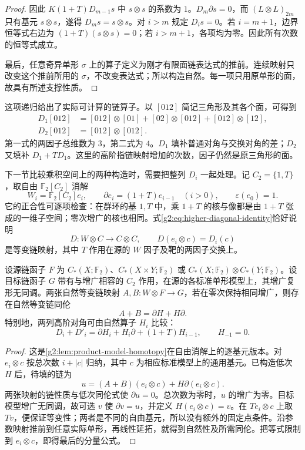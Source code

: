 \begin{proof}
	因此 \(K(1+T)D_{m-1}s\) 中 \(s\otimes s\) 的系数为 \(1\)。\(D_m\partial s=0\)，而 \((L\otimes L)_{2m}\) 只有基元 \(s\otimes s\)，遂得 \(D_ms=s\otimes s\)。对 \(i>m\) 规定 \(D_is=0\)。若 \(i=m+1\)，边界恒等式右边为 \((1+T)(s\otimes s)=0\)；若 \(i>m+1\)，各项均为零。因此所有次数的恒等式成立。

	最后，任意奇异单形 \(\sigma\) 上的算子定义为刚才有限面链表达式的推前。连续映射只改变这个推前所用的 \(\sigma\)，不改变表达式；所以构造自然。每一项只用原单形的面，故具有所述支撑性质。
\end{proof}

这项递归给出了实际可计算的链算子。以 \([012]\) 简记三角形及其各个面，可得到
\[
	\begin{aligned}
		D_1[012]&=[012]\otimes[01]+[02]\otimes[012]+[012]\otimes[12],\\
		D_2[012]&=[012]\otimes[012].
	\end{aligned}
\]
第一式的两因子总维数为 \(3\)，第二式为 \(4\)。\(D_1\) 填补普通对角与交换对角的差；\(D_2\) 又填补 \(D_1+TD_1\)。这里的高阶指链映射增加的次数，因子仍然是原三角形的面。

\ProseParagraphBreak

下一节比较乘积空间上的两种构造时，需要把整列 \(D_i\) 一起处理。记 \(C_2=\{1,T\}\)，取自由 \(\mathbb F_2[C_2]\) 消解
\[
	W_i=\mathbb F_2[C_2]e_i,\qquad
	\partial e_i=(1+T)e_{i-1}\quad(i>0),\qquad \varepsilon(e_0)=1.
\]
它的正合性可逐项检查：在群环的基 \(1,T\) 中，乘 \(1+T\) 的核与像都是由 \(1+T\) 张成的一维子空间；零次增广的核也相同。式\eqref{g2:eq:higher-diagonal-identity}恰好说明
\[
	D:W\otimes C\longrightarrow C\otimes C,\qquad D(e_i\otimes c)=D_i(c)
\]
是等变链映射，其中 \(T\) 作用在源的 \(W\) 因子及靶的两因子交换上。

\begin{lemma}\label{g2:lem:higher-diagonal-comparison}
	设源链函子 \(F\) 为 \(C_*(X;\mathbb F_2)\)、\(C_*(X\times Y;\mathbb F_2)\) 或 \(C_*(X;\mathbb F_2)\otimes C_*(Y;\mathbb F_2)\)。设目标链函子 \(G\) 带有与增广相容的 \(C_2\) 作用，在源的各标准单形模型上，其增广复形无同调。两张自然等变链映射 \(A,B:W\otimes F\to G\)，若在零次保持相同增广，则存在自然等变链同伦
	\[
		A+B=\partial H+H\partial.
	\]
	特别地，两列高阶对角可由自然算子 \(H_i\) 比较：
	\begin{equation}\label{g2:eq:higher-diagonal-comparison}
		D_i+D'_i=\partial H_i+H_i\partial+(1+T)H_{i-1},\qquad H_{-1}=0.
	\end{equation}
\end{lemma}
\begin{proof}
	这是\cref{g2:lem:product-model-homotopy}在自由消解上的逐基元版本。对 \(e_i\otimes c\) 按总次数 \(i+|c|\) 归纳，其中 \(c\) 为相应标准模型上的通用基元。已构造低次 \(H\) 后，待填的链为
	\[
		u=(A+B)(e_i\otimes c)+H\partial(e_i\otimes c).
	\]
	两张映射的链性质与低次同伦式使 \(\partial u=0\)。总次数为零时，\(u\) 的增广为零。目标模型增广无同调，故可选 \(v\) 使 \(\partial v=u\)，并定义 \(H(e_i\otimes c)=v\)。在 \(Te_i\otimes c\) 上取 \(Tv\)，便保证等变性；两者是不同的自由基元，所以没有额外的固定点条件。沿参数映射推前到任意实际单形，再线性延拓，就得到自然性及所需同伦。把等式限制到 \(e_i\otimes c\)，即得最后的分量公式。
\end{proof}


